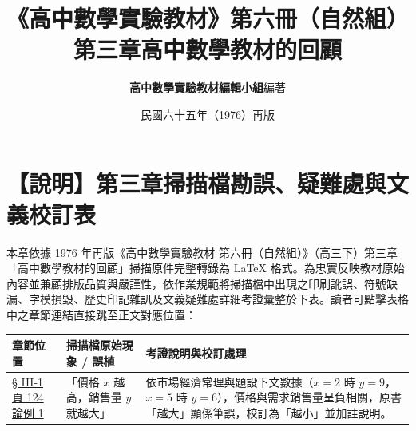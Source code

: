 \documentclass[a4paper,12pt,twoside]{article}
\title{\LARGE\textbf{《高中數學實驗教材》第六冊（自然組）}\\[0.5em] \Large\textbf{第三章\quad 高中數學教材的回顧}}
\author{\textbf{高中數學實驗教材編輯小組}\quad 編著}
\date{民國六十五年（1976）再版}
\begin{document}
\maketitle
\thispagestyle{firstpage}

\section*{【說明】第三章掃描檔勘誤、疑難處與文義校訂表}
\label{sec:errata_notes_b6_ch3}
\label{sec:current_errata}

本章依據 1976 年再版《高中數學實驗教材 第六冊（自然組）》（高三下）第三章「高中數學教材的回顧」掃描原件完整轉錄為 \LaTeX{} 格式。為忠實反映教材原始內容並兼顧排版品質與嚴謹性，依作業規範將掃描檔中出現之印刷訛誤、符號缺漏、字模損毀、歷史印記雜訊及文義疑難處詳細考證彙整於下表。讀者可點擊表格中之章節連結直接跳至正文對應位置：

\begin{table}[H]
\centering
\small
\renewcommand{\arraystretch}{1.35}
\begin{tabularx}{\textwidth}{|p{3.2cm}|p{3.8cm}|X|}
\hline
\textbf{章節位置} & \textbf{掃描檔原始現象 / 誤植} & \textbf{考證說明與校訂處理} \\ \hline

\hyperref[note:b6-ch3-p124-sales]{§ III-1 頁 124 論例 1} & 
「價格 $x$ 越高，銷售量 $y$ 就越大」 & 
依市場經濟常理與題設下文數據（$x=2$ 時 $y=9$，$x=5$ 時 $y=6$），價格與需求銷售量呈負相關，原書「越大」顯係筆誤，校訂為「越小」並加註說明。 \\ \hline

\end{tabularx}
\end{table}

\newpage
\renewcommand{\contentsname}{目\qquad 次}
\tableofcontents
\newpage

\setcounter{section}{2}

\end{document}
